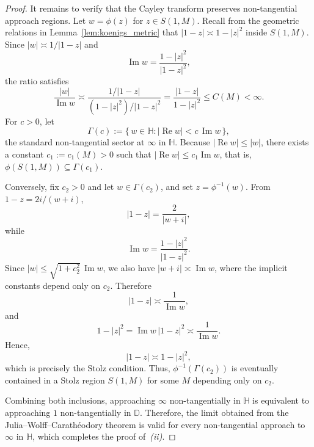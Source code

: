 \documentclass[10pt,a4paper]{amsart}
\numberwithin{equation}{section}
\begin{document}
\begin{proof}
It remains to verify that the Cayley transform preserves
non-tangential approach regions.
Let $w=\phi(z)$ for $z\in S(1,M)$.
Recall from the geometric relations in
Lemma~\ref{lem:koenigs_metric} that
$|1-z|\asymp1-|z|^2$
inside $S(1,M)$.
Since
$|w|\asymp1/|1-z|$
and
\begin{equation*}
\operatorname{Im}w
=
\frac{1-|z|^2}{|1-z|^2},
\end{equation*}
the ratio satisfies
\begin{equation*}
\frac{|w|}{\operatorname{Im}w}
\asymp
\frac{1/|1-z|}
{(1-|z|^2)/|1-z|^2}
=
\frac{|1-z|}{1-|z|^2}
\le C(M)<\infty.
\end{equation*}
For $c>0$, let
\begin{equation*}
\Gamma(c)
:=
\{\,w\in\mathbb H:
|\operatorname{Re}w|
<
c\,\operatorname{Im}w
\,\},
\end{equation*}
the standard non-tangential sector at $\infty$ in $\mathbb H$.
Because $|\operatorname{Re}w|\le|w|$, there exists a constant
$c_1:=c_1(M)>0$ such that
$|\operatorname{Re}w|
\le
c_1\operatorname{Im}w$,
that is,
$\phi(S(1,M))
\subseteq
\Gamma(c_1)$.

Conversely, fix $c_2>0$ and let
$w\in\Gamma(c_2)$, and set
$z=\phi^{-1}(w)$.
From
$1-z=2i/(w+i)$,
\begin{equation*}
|1-z|
=
\frac2{|w+i|},
\end{equation*}
while
\begin{equation*}
\operatorname{Im}w
=
\frac{1-|z|^2}{|1-z|^2}.
\end{equation*}
Since
$|w|
\le
\sqrt{1+c_2^2}\,\operatorname{Im}w$,
we also have
$|w+i|
\asymp
\operatorname{Im}w$,
where the implicit constants depend only on $c_2$.
Therefore
\begin{equation*}
|1-z|
\asymp
\frac1{\operatorname{Im}w},
\end{equation*}
and
\begin{equation*}
1-|z|^2
=
\operatorname{Im}w\,|1-z|^2
\asymp
\frac1{\operatorname{Im}w}.
\end{equation*}
Hence,
\begin{equation*}
|1-z|
\asymp
1-|z|^2,
\end{equation*}
which is precisely the Stolz condition.
Thus,
$\phi^{-1}(\Gamma(c_2))$
is eventually contained in a Stolz region
$S(1,M)$ for some $M$ depending only on $c_2$.

Combining both inclusions, approaching $\infty$
non-tangentially in $\mathbb{H}$ is equivalent to
approaching $1$ non-tangentially in $\mathbb{D}$.
Therefore, the limit obtained from the
Julia--Wolff--Carath\'eodory theorem is valid for every
non-tangential approach to $\infty$ in $\mathbb{H}$,
which completes the proof of~\emph{(ii)}.
\end{proof}
\end{document}
